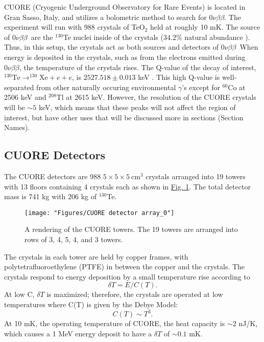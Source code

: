 \documentclass[12pt,a4paper]{article}
\newcommand{\zeronubb}{$0\nu \beta \beta$}
\begin{document}
CUORE (Cryogenic Underground Observatory for Rare Events) is located in Gran Sasso, Italy, and utilizes a bolometric method to search for \zeronubb. The experiment will run with 988 crystals of TeO$_2$ held at roughly 10 mK. The source of \zeronubb~are the $^{130}$Te nuclei inside of the crystals ($34.2\%$ natural abundance \cite{Fehr200483}). Thus, in this setup, the crystals act as both sources and detectors of \zeronubb~When energy is deposited in the crystals, such as from the electrons emitted during \zeronubb, the temperature of the crystals rises. The Q-value of the decay of interest, $^{130}\textrm{Te} \rightarrow ^{130}\textrm{Xe} + e + e$, is $2527.518\pm 0.013$ keV \cite{Redshaw:2009cf}\cite{Scielzo:2009nh}\cite{Rahaman:2011zz}. This high Q-value is well-separated from other naturally occuring environmental $\gamma$'s except for $^{60}$Co at 2506 keV and $^{208}$Tl at 2615 keV. However, the resolution of the CUORE crystals will be $\sim5$ keV, which means that these peaks will not affect the region of interest, but have other uses that will be discussed more in sections (\color{green}Section Names\color{black}).

\subsection{CUORE Detectors}

The CUORE detectors are 988 $ 5\times 5 \times 5~ \textrm{cm}^3$ crystals arranged into 19 towers with 13 floors containing 4 crystals each as shown in \hyperref[fig:cuore-detector-array0]{Fig. \ref*{fig:cuore-detector-array0}}. The total detector mass is 741 kg with 206 kg of $^{130}$Te. 

\begin{figure}[htbp]
\centering
\texttt{[image: "Figures/CUORE detector array\_0"]}
\caption{A rendering of the CUORE towers. The 19 towers are arranged into rows of 3, 4, 5, 4, and 3 towers.}
\label{fig:cuore-detector-array0}
\end{figure}


The crystals in each tower are held by copper frames, with polytetrafluoroethylene (PTFE) in between the copper and the crystals. The crystals respond to energy deposition by a small temperature rise according to
\begin{equation}
\delta T = E/C(T).
\end{equation}
At low C, $\delta T$ is maximized; therefore, the crystals are operated at low temperatures where C(T) is given by the Debye Model:
\begin{equation}
C(T)\sim T^3.
\end{equation}
At 10 mK, the operating temperature of CUORE, the heat capacity is $\sim2$ nJ/K, which causes a 1 MeV energy deposit to have a $\delta T$ of $\sim0.1$ mK.
\end{document}
